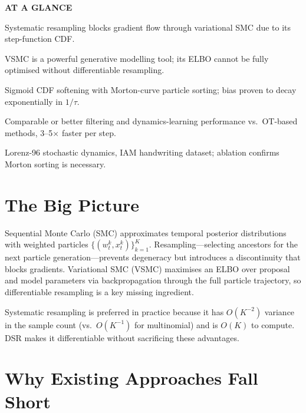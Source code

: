 \documentclass[10pt,twocolumn]{article}
\begin{document}
\begin{mdframed}[backgroundcolor=boxgray,linecolor=rulered,linewidth=1pt,
    innerleftmargin=6pt,innerrightmargin=6pt,
    innertopmargin=6pt,innerbottommargin=6pt]
\textbf{\small AT A GLANCE}\par\vspace{4pt}
\begin{description}[leftmargin=0pt,labelsep=4pt,itemsep=2pt,parsep=0pt,
    font=\small\bfseries]
  \item[Problem:] Systematic resampling blocks gradient flow through variational
    SMC due to its step-function CDF.
  \item[Why it matters:] VSMC is a powerful generative modelling tool; its
    ELBO cannot be fully optimised without differentiable resampling.
  \item[Method:] Sigmoid CDF softening with Morton-curve particle sorting;
    bias proven to decay exponentially in $1/\tau$.
  \item[Result:] Comparable or better filtering and dynamics-learning
    performance vs.\ OT-based methods, 3--5$\times$ faster per step.
  \item[Evidence:] Lorenz-96 stochastic dynamics, IAM handwriting dataset;
    ablation confirms Morton sorting is necessary.
\end{description}
\end{mdframed}

\section{The Big Picture}

Sequential Monte Carlo (SMC) approximates temporal posterior distributions
with weighted particles $\{(w_t^k, x_t^k)\}_{k=1}^K$. Resampling---selecting
ancestors for the next particle generation---prevents degeneracy but
introduces a discontinuity that blocks gradients. Variational SMC (VSMC)
maximises an ELBO over proposal and model parameters via backpropagation
through the full particle trajectory, so differentiable resampling is
a key missing ingredient.

Systematic resampling is preferred in practice because it has $O(K^{-2})$
variance in the sample count (vs.\ $O(K^{-1})$ for multinomial) and is
$O(K)$ to compute. DSR makes it differentiable without sacrificing these
advantages.

\section{Why Existing Approaches Fall Short}
\end{document}
